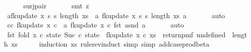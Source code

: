 \begin{isabellebody}
\ \ \ \ \isamarkupfalse%
\ surj{\isacharunderscore}{\kern0pt}pair\ \isanewline
\ \ \ \ \isamarkupfalse%
\ {\isacharparenleft}{\kern0pt}smt\ {\isacharparenleft}{\kern0pt}z{}{\isacharparenright}{\kern0pt}{\isacharparenright}{\kern0pt}\isanewline
\ \ \isamarkupfalse%
\ a{\isacharcolon}{\kern0pt}{\isachardoublequoteopen}fk{\isacharunderscore}{\kern0pt}update{\isacharprime}{\kern0pt}\ x\ s\ s\ {\isacharparenleft}{\kern0pt}length\ xs{\isacharparenright}{\kern0pt}\ {\isacharequal}{\kern0pt}\ {\isacharparenleft}{\kern0pt}{\isasymlambda}a{\isachardot}{\kern0pt}\ fk{\isacharunderscore}{\kern0pt}update{\isacharprime}{\kern0pt}\ x\ s\ s\ {\isacharparenleft}{\kern0pt}length\ xs{\isacharparenright}{\kern0pt}\ a{\isacharparenright}{\kern0pt}{\isachardoublequoteclose}\ \isanewline
\ \ \ \ \isamarkupfalse%
\ auto\isanewline
\ \ \isamarkupfalse%
\ c{\isacharcolon}{\kern0pt}{\isachardoublequoteopen}{\isasymAnd}c{\isachardot}{\kern0pt}\ fk{\isacharunderscore}{\kern0pt}update{\isacharprime}{\kern0pt}{\isacharprime}{\kern0pt}\ x\ c\ {\isacharequal}{\kern0pt}\ {\isacharparenleft}{\kern0pt}{\isasymlambda}a{\isachardot}{\kern0pt}\ fk{\isacharunderscore}{\kern0pt}update{\isacharprime}{\kern0pt}{\isacharprime}{\kern0pt}\ x\ c\ {\isacharparenleft}{\kern0pt}fst\ a{\isacharcomma}{\kern0pt}snd\ a{\isacharparenright}{\kern0pt}{\isacharparenright}{\kern0pt}{\isachardoublequoteclose}\ \isanewline
\ \ \ \ \isamarkupfalse%
\ auto\isanewline
\ \ \isamarkupfalse%
\ {\isachardoublequoteopen}fst\ {\isacharparenleft}{\kern0pt}fold\ {\isacharparenleft}{\kern0pt}{\isasymlambda}x\ {\isacharparenleft}{\kern0pt}c{\isacharcomma}{\kern0pt}\ state{\isacharparenright}{\kern0pt}{\isachardot}{\kern0pt}\ {\isacharparenleft}{\kern0pt}Suc\ c{\isacharcomma}{\kern0pt}\ state\ {\isasymbind}\ fk{\isacharunderscore}{\kern0pt}update{\isacharprime}{\kern0pt}{\isacharprime}{\kern0pt}\ x\ c{\isacharparenright}{\kern0pt}{\isacharparenright}{\kern0pt}\ xs\ {\isacharparenleft}{\kern0pt}{}{\isacharcomma}{\kern0pt}\ return{\isacharunderscore}{\kern0pt}pmf\ undefined{\isacharparenright}{\kern0pt}{\isacharparenright}{\kern0pt}\ {\isacharequal}{\kern0pt}\ length\ xs{\isachardoublequoteclose}\isanewline
\ \ \ \ \isamarkupfalse%
\ {\isacharparenleft}{\kern0pt}induction\ xs\ rule{\isacharcolon}{\kern0pt}rev{\isacharunderscore}{\kern0pt}induct{\isacharcomma}{\kern0pt}\ simp{\isacharcomma}{\kern0pt}\ simp\ add{\isacharcolon}{\kern0pt}case{\isacharunderscore}{\kern0pt}prod{\isacharunderscore}{\kern0pt}beta{\isacharparenright}{\kern0pt}\isanewline

\end{isabellebody}

